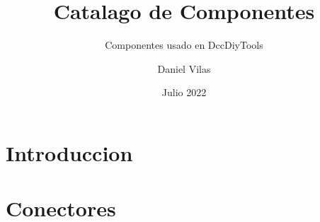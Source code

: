\documentclass[spanish]{DccDiyTools/DccDiyTools}
\title{Catalago de Componentes}
\subtitle{Componentes usado en DccDiyTools}
\author{Daniel Vilas}
\date{Julio 2022}
\begin{document}
\maketitle
\section{Introduccion}


\newpage
\section{Conectores}

\end{document}

